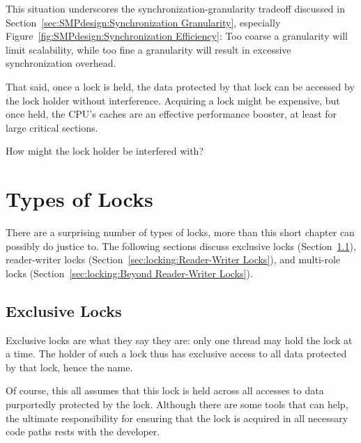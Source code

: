 This situation underscores the synchronization-granularity
tradeoff discussed in Section~\ref{sec:SMPdesign:Synchronization Granularity},
especially Figure~\ref{fig:SMPdesign:Synchronization Efficiency}:
Too coarse a granularity will limit scalability, while too fine a
granularity will result in excessive synchronization overhead.

That said, once a lock is held, the data protected by that lock can
be accessed by the lock holder without interference.
Acquiring a lock might be expensive, but once held, the CPU's caches
are an effective performance booster, at least for large critical sections.

\QuickQuiz{}
	How might the lock holder be interfered with?
 \QuickQuizEnd

\section{Types of Locks}
\label{sec:locking:Types of Locks}

There are a surprising number of types of locks, more than this
short chapter can possibly do justice to.
The following sections discuss
exclusive locks (Section~\ref{sec:locking:Exclusive Locks}),
reader-writer locks (Section~\ref{sec:locking:Reader-Writer Locks}), and
multi-role locks (Section~\ref{sec:locking:Beyond Reader-Writer Locks}).

\subsection{Exclusive Locks}
\label{sec:locking:Exclusive Locks}

Exclusive locks are what they say they are: only one thread may hold
the lock at a time.
The holder of such a lock thus has exclusive access to all data protected
by that lock, hence the name.

Of course, this all assumes that this lock is held across all accesses
to data purportedly protected by the lock.
Although there are some tools that can help, the ultimate responsibility
for ensuring that the lock is acquired in all necessary code paths
rests with the developer.

